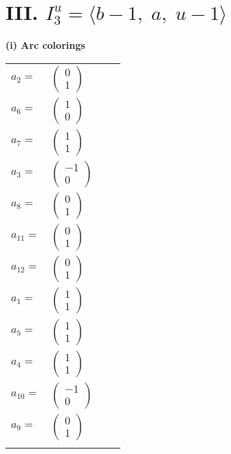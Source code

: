 \documentclass[1p]{elsarticle_modified}
\theoremstyle{definition}
\begin{document}
\centering \section*{III. $I^u_{3}= \langle b-1,\;a,\;u-1 \rangle$}
\flushleft \textbf{(i) Arc colorings}\\
\begin{tabular}{m{7pt} m{180pt} m{7pt} m{180pt} }
\flushright $a_{2}=$&$\begin{pmatrix}0\\1\end{pmatrix}$ \\
\flushright $a_{6}=$&$\begin{pmatrix}1\\0\end{pmatrix}$ \\
\flushright $a_{7}=$&$\begin{pmatrix}1\\1\end{pmatrix}$ \\
\flushright $a_{3}=$&$\begin{pmatrix}-1\\0\end{pmatrix}$ \\
\flushright $a_{8}=$&$\begin{pmatrix}0\\1\end{pmatrix}$ \\
\flushright $a_{11}=$&$\begin{pmatrix}0\\1\end{pmatrix}$ \\
\flushright $a_{12}=$&$\begin{pmatrix}0\\1\end{pmatrix}$ \\
\flushright $a_{1}=$&$\begin{pmatrix}1\\1\end{pmatrix}$ \\
\flushright $a_{5}=$&$\begin{pmatrix}1\\1\end{pmatrix}$ \\
\flushright $a_{4}=$&$\begin{pmatrix}1\\1\end{pmatrix}$ \\
\flushright $a_{10}=$&$\begin{pmatrix}-1\\0\end{pmatrix}$ \\
\flushright $a_{9}=$&$\begin{pmatrix}0\\1\end{pmatrix}$\\&\end{tabular}
\end{document}
